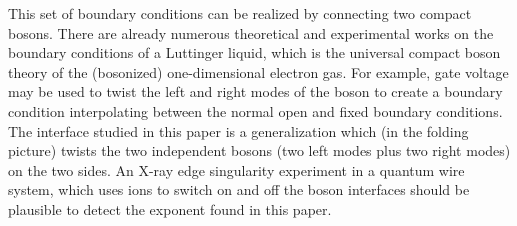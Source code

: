 This set of boundary conditions can be realized by connecting two compact bosons. There are already numerous theoretical and experimental works on the boundary conditions of a Luttinger liquid\cite{schmeltzer_zero_1999,anfuso_luttinger_2003,voit_bounded_2000,fabrizio_interacting_1995,egger_applying_1998}, which is the universal compact boson theory of the (bosonized) one-dimensional electron gas\cite{giamarchi_quantum_2015}. For example, gate voltage \cite{egger_applying_1998} may be used to twist the left and right modes of the boson to create a boundary condition interpolating between the normal open and fixed boundary conditions. The interface studied in this paper is a generalization which (in the folding picture) twists the two independent bosons (two left modes plus two right modes) on the two sides. An X-ray edge singularity experiment in a quantum wire system, which uses ions to switch on and off the boson interfaces should be plausible to detect the exponent found in this paper. 


